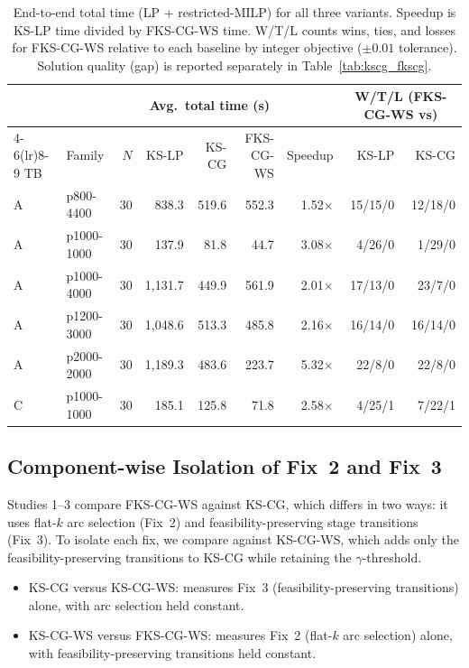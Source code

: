 \begin{table}[htbp]
\centering
\caption{End-to-end total time (LP + restricted-MILP) for all three variants.
         Speedup is KS-LP time divided by FKS-CG-WS time.
         W/T/L counts wins, ties, and losses for FKS-CG-WS relative to each
         baseline by integer objective ($\pm 0.01$ tolerance).
         Solution quality (gap) is reported separately in
         Table~\ref{tab:kscg_fkscg}.}
\label{tab:end_to_end}
\footnotesize
\setlength{\tabcolsep}{3pt}
\begin{tabular}{llrrrrrrr}
\toprule
 & & & \multicolumn{3}{c}{Avg.\ total time (s)} & & \multicolumn{2}{c}{W/T/L (FKS-CG-WS vs)} \\
\cmidrule(lr){4-6}\cmidrule(lr){8-9}
TB & Family & $N$ & KS-LP & KS-CG & FKS-CG-WS & Speedup & KS-LP & KS-CG \\
\midrule
A & p800-4400  & 30 &   838.3 & 519.6 & 552.3 & 1.52$\times$ & 15/15/0 & 12/18/0 \\
A & p1000-1000 & 30 &   137.9 &  81.8 &  44.7 & 3.08$\times$ &  4/26/0 &  1/29/0 \\
A & p1000-4000 & 30 & 1{,}131.7 & 449.9 & 561.9 & 2.01$\times$ & 17/13/0 & 23/7/0  \\
A & p1200-3000 & 30 & 1{,}048.6 & 513.3 & 485.8 & 2.16$\times$ & 16/14/0 & 16/14/0 \\
A & p2000-2000 & 30 & 1{,}189.3 & 483.6 & 223.7 & 5.32$\times$ & 22/8/0  & 22/8/0  \\
\midrule
C & p1000-1000 & 30 & 185.1 & 125.8 & 71.8 & 2.58$\times$ & 4/25/1 & 7/22/1 \\
\bottomrule
\end{tabular}
\end{table}

\subsection{Component-wise Isolation of Fix~2 and Fix~3}
\label{sec:study_components}

Studies 1--3 compare FKS-CG-WS against KS-CG, which differs in two ways: it uses
flat-$k$ arc selection (Fix~2) and feasibility-preserving stage transitions
(Fix~3).
To isolate each fix, we compare against KS-CG-WS, which adds only the
feasibility-preserving transitions to KS-CG while retaining the $\gamma$-threshold.

\begin{itemize}
  \item KS-CG versus KS-CG-WS: measures Fix~3 (feasibility-preserving
        transitions) alone, with arc selection held constant.
  \item KS-CG-WS versus FKS-CG-WS: measures Fix~2 (flat-$k$ arc selection) alone,
        with feasibility-preserving transitions held constant.
\end{itemize}

